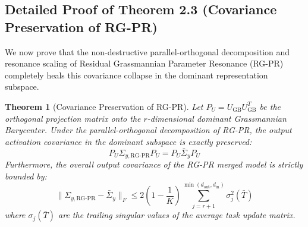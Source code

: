 \documentclass{article}
\theoremstyle{plain}
\newtheorem*{theorem*}{Theorem}
\theoremstyle{definition}
\theoremstyle{remark}
\begin{document}
\subsection{Detailed Proof of Theorem 2.3 (Covariance Preservation of RG-PR)}
\label{app:proof_theorem_2_3}

We now prove that the non-destructive parallel-orthogonal decomposition and resonance scaling of Residual Grassmannian Parameter Resonance (RG-PR) completely heals this covariance collapse in the dominant representation subspace.

\begin{theorem*}[Covariance Preservation of RG-PR]
Let $P_U = U_{\text{GB}} U_{\text{GB}}^T$ be the orthogonal projection matrix onto the $r$-dimensional dominant Grassmannian Barycenter. Under the parallel-orthogonal decomposition of RG-PR, the output activation covariance in the dominant subspace is exactly preserved:
\begin{equation}
P_U \Sigma_{y, \text{RG-PR}} P_U = P_U \bar{\Sigma}_y P_U
\end{equation}
Furthermore, the overall output covariance of the RG-PR merged model is strictly bounded by:
\begin{equation}
\| \Sigma_{y, \text{RG-PR}} - \bar{\Sigma}_y \|_F \le 2 \left( 1 - \frac{1}{K} \right) \sum_{j=r+1}^{\min(d_{\text{out}}, d_{\text{in}})} \sigma_j^2(\bar{T})
\end{equation}
where $\sigma_j(\bar{T})$ are the trailing singular values of the average task update matrix.
\end{theorem*}
\end{document}

